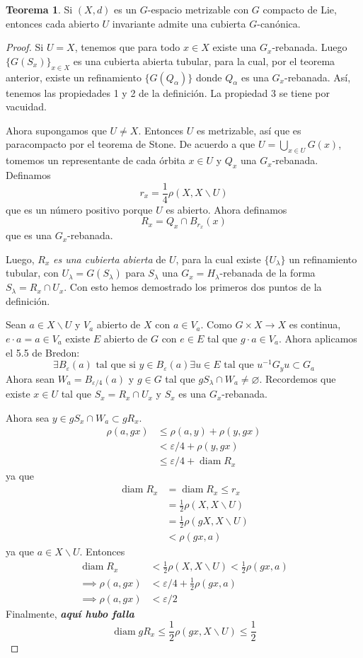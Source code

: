\documentclass[spanish]{article}
\theoremstyle{definition}
\newtheorem*{teo}{Teorema}
\begin{document}
\begin{teo}
	Si $(X,d)$ es un $G$-espacio metrizable con $G$ compacto de Lie, entonces cada abierto $U$ invariante admite una cubierta $G$-canónica.
\end{teo}
\iffalse
\begin{proof}
	Si $U=X$, tenemos que para todo $x\in X$ existe una $G_x$-rebanada. Luego $\{G(S_x)\}_{x\in X}$ es una cubierta abierta tubular, para la cual, por el teorema anterior, existe un refinamiento $\{G(Q_\alpha)\}$ donde $Q_\alpha$ es una $G_x$-rebanada. Así, tenemos las propiedades 1 y 2 de la definición. La propiedad 3 se tiene por vacuidad.
	
	Ahora supongamos que $U\neq X$. Entonces $U$ es metrizable, así que es paracompacto por el teorema de Stone. De acuerdo a que $U=\bigcup_{x\in U}G(x)$, tomemos un representante de cada órbita $x\in U$ y  $Q_x$ una $G_x$-rebanada. Definamos
	\[r_x=\frac{1}{4}\rho(X,X\backslash U)\]
	que es un número positivo porque $U$ es abierto. Ahora definamos
	\[R_x=Q_x\cap B_{r_x}(x)\]
	que es una $G_x$-rebanada.
	
	Luego, $R_x$ \textit{es una cubierta abierta} de $U$, para la cual existe $\{U_\lambda\}$ un refinamiento tubular, con $U_\lambda=G(S_\lambda)$ para $S_\lambda$ una $G_x=H_\lambda$-rebanada de la forma $S_\lambda=R_x\cap U_x$. Con esto hemos demostrado los primeros dos puntos de la definición.
	
	Sean $a\in X\backslash U$ y $V_a$ abierto de $X$ con $a\in V_a$. Como $G\times X\to X$ es continua, $e\cdot a=a\in V_a$ existe $E$ abierto de $G$ con $e\in E$ tal que $g\cdot a\in V_a$. Ahora aplicamos el 5.5 de Bredon:
	\[\exists B_\varepsilon(a)\text{ tal que si } y\in B_\varepsilon(a)\exists u\in E\text{ tal que }u^{-1}G_yu\subset G_a\]
	Ahora sean $W_a=B_{\varepsilon/4}(a)$ y $g\in G$ tal que $gS_\lambda\cap W_a\neq\varnothing$. Recordemos que existe $x\in U$ tal que $S_x=R_x\cap U_x$ y $S_x$ es una $G_x$-rebanada.
	
	Ahora sea $y\in gS_x\cap W_a\subset gR_x$.
	\begin{align*}
		\rho(a,gx)&\leq\rho(a,y)+\rho(y,gx)\\
		&<\varepsilon/4+\rho(y,gx)\\
		&\leq \varepsilon/4+\operatorname{diam}R_x
	\end{align*}
	ya que
	 \begin{align*}\operatorname{diam}R_x&=\operatorname{diam}R_x\leq r_x\\
	 	&=\frac{1}{2}\rho(X,X\backslash U)\\
	 	&=\frac{1}{2}\rho(gX,X\backslash U)\\
	 	&<\rho(gx,a)
 	\end{align*}
 	ya que $a\in X\backslash U$. Entonces
 	\begin{align*}
 		\operatorname{diam}R_x&<\frac{1}{2}\rho(X,X\backslash U)<\frac{1}{2}\rho(gx,a)\\
 		\implies \rho(a,gx)&<\varepsilon/4+\frac{1}{2}\rho(gx,a)\\
 		\implies\rho(a,gx)&<\varepsilon/2
	\end{align*}
	Finalmente, \textbf{\textit{aquí hubo falla}}
	\[\operatorname{diam}gR_x\leq\frac{1}{2}\rho(gx,X\backslash U)\leq\frac{1}{2}\]
\end{proof}
\end{document}
